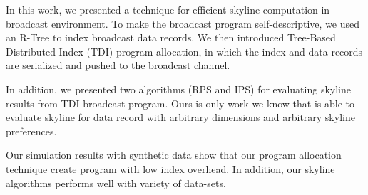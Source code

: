 In this work, we presented a technique for efficient skyline computation in broadcast environment. To make the broadcast program self-descriptive, we used an R-Tree to index broadcast data records. We then introduced Tree-Based Distributed Index (TDI) program allocation, in which the index and data records are serialized and pushed to the broadcast channel.

In addition, we presented two algorithms (RPS and IPS) for evaluating skyline results from TDI broadcast program. Ours is only work we know that is able to evaluate skyline for data record with arbitrary dimensions and arbitrary skyline preferences.

Our simulation results with synthetic data show that our program allocation technique create program with low index overhead. In addition, our skyline algorithms performs well with variety of data-sets.



